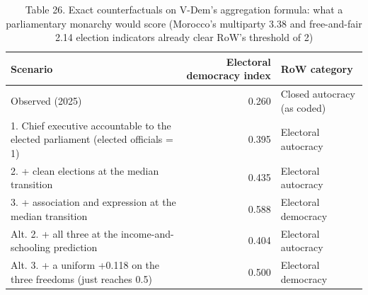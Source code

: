 \begin{table}
\caption{Table 26. Exact counterfactuals on V-Dem's aggregation formula: what a parliamentary monarchy would score (Morocco's multiparty 3.38 and free-and-fair 2.14 election indicators already clear RoW's threshold of 2)}
\label{tab:T26_counterfactuals}
\begin{tabular}{lrl}
\toprule
Scenario & Electoral democracy index & RoW category \\
\midrule
Observed (2025) & 0.260 & Closed autocracy (as coded) \\
1. Chief executive accountable to the elected parliament (elected officials = 1) & 0.395 & Electoral autocracy \\
2. + clean elections at the median transition & 0.435 & Electoral autocracy \\
3. + association and expression at the median transition & 0.588 & Electoral democracy \\
Alt. 2. + all three at the income-and-schooling prediction & 0.404 & Electoral autocracy \\
Alt. 3. + a uniform +0.118 on the three freedoms (just reaches 0.5) & 0.500 & Electoral democracy \\
\bottomrule
\end{tabular}
\end{table}
